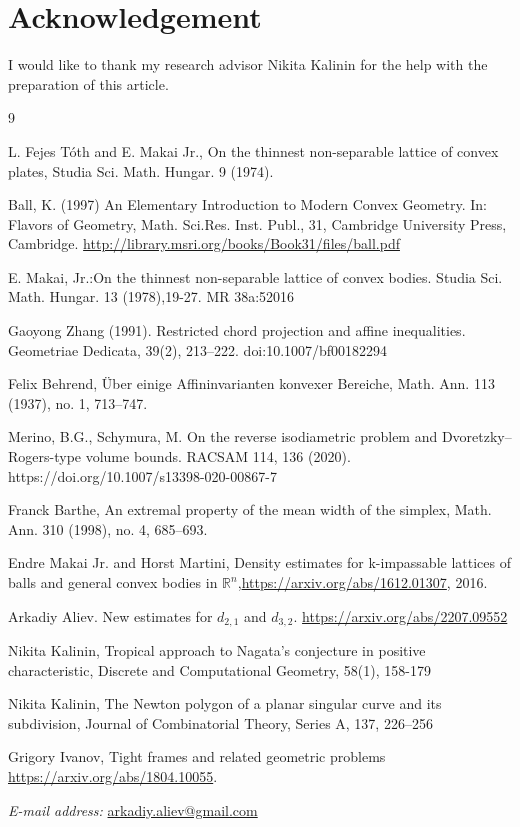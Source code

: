 \documentclass[12pt]{article}
\begin{document}
\section*{Acknowledgement}
\noindent I would like to thank my research advisor Nikita Kalinin for the help with the preparation of this article.

\begin{thebibliography}{9}

    
     L. Fejes T\'oth and E. Makai Jr., On the thinnest non-separable lattice of convex plates, Studia Sci. Math. Hungar. 9 (1974).

     Ball, K. (1997) An Elementary Introduction to Modern Convex Geometry. In: Flavors of Geometry, Math. Sci.Res. Inst. Publ., 31, Cambridge University Press, Cambridge. \url{http://library.msri.org/books/Book31/files/ball.pdf}


    E. Makai, Jr.:On the thinnest non-separable lattice of convex bodies. Studia Sci. Math. Hungar. 13 (1978),19-27. MR 38a:52016

  Gaoyong Zhang (1991). Restricted chord projection and affine inequalities. Geometriae Dedicata, 39(2), 213–222. doi:10.1007/bf00182294 


    Felix Behrend, Über einige Affininvarianten konvexer Bereiche, Math. Ann. 113
(1937), no. 1, 713–747.

   
 Merino, B.G., Schymura, M. On the reverse isodiametric problem and Dvoretzky–Rogers-type volume bounds. RACSAM 114, 136 (2020). https://doi.org/10.1007/s13398-020-00867-7

 Franck Barthe, An extremal property of the mean width of the simplex, Math. Ann.
310 (1998), no. 4, 685–693.

  Endre Makai Jr. and Horst Martini, Density estimates for k-impassable lattices of balls and general convex bodies in $\mathbb{R}^n$,\url{https://arxiv.org/abs/1612.01307}, 2016.
      
    
   Arkadiy Aliev. New estimates for $d_{2,1}$ and $d_{3,2}$. \url{https://arxiv.org/abs/2207.09552}

   Nikita Kalinin, Tropical approach to Nagata’s conjecture in positive characteristic, Discrete and Computational Geometry, 58(1), 158-179

   Nikita Kalinin, The Newton polygon of a planar singular curve and its subdivision, Journal of
Combinatorial Theory, Series A, 137, 226–256

  

     Grigory Ivanov, Tight frames and related geometric problems \url{https://arxiv.org/abs/1804.10055}.

   
    

    
    
\end{thebibliography}

\textit{E-mail address:} \href{mailto:arkadiy.aliev@gmail.com}{arkadiy.aliev@gmail.com} 
\end{document}
